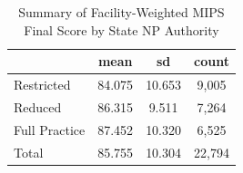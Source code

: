 \begin{table}[htbp]\centering
\def\sym#1{\ifmmode^{#1}\else\(^{#1}\)\fi}
\caption{Summary of Facility-Weighted MIPS Final Score by State NP Authority}
\begin{tabular}{l*{1}{ccc}}
\toprule
                    &        mean&          sd&       count\\
\midrule
Restricted          &      84.075&      10.653&       9,005\\
Reduced             &      86.315&       9.511&       7,264\\
Full Practice       &      87.452&      10.320&       6,525\\
Total               &      85.755&      10.304&      22,794\\
\bottomrule
\end{tabular}
\end{table}
